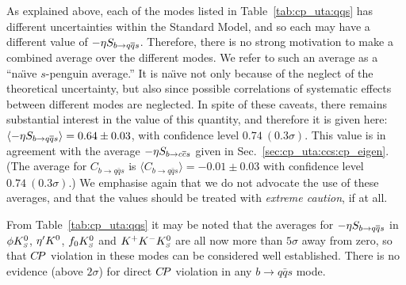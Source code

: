 As explained above,
each of the modes listed in Table~\ref{tab:cp_uta:qqs} has
different uncertainties within the Standard Model,
and so each may have a different value of $-\etacp S_{b \to q\bar q s}$.
Therefore, there is no strong motivation to make a combined average
over the different modes.
We refer to such an average as a ``na\"\i ve $s$-penguin average.''
It is na\"\i ve not only because of the neglect of the theoretical uncertainty,
but also since possible correlations of systematic effects 
between different modes are neglected.
In spite of these caveats, there remains substantial interest 
in the value of this quantity,
and therefore it is given here:
$\langle -\etacp S_{b \to q\bar q s} \rangle = 0.64 \pm 0.03$,
with confidence level $0.74~(0.3\sigma)$.
This value is in agreement with the average 
$-\etacp S_{b \to c\bar c s}$ given in Sec.~\ref{sec:cp_uta:ccs:cp_eigen}.
%
(The average for $C_{b \to q\bar q s}$ is 
$\langle C_{b \to q\bar q s} \rangle = -0.01 \pm 0.03$
with confidence level $0.74~(0.3\sigma)$.)
%
We emphasise again that we do not advocate the use of these averages,
and that the values should be treated with {\it extreme caution}, if at all.

From Table~\ref{tab:cp_uta:qqs} it may be noted 
that the averages for $-\etacp S_{b \to q\bar q s}$ in 
$\phi K^0_{\scriptscriptstyle S}$, ${\eta^{\prime}} K^0$, $f_0K^0_{\scriptscriptstyle S}$ and $K^+K^-K^0_{\scriptscriptstyle S}$
are all now more than $5\sigma$ away from zero, 
so that $C\!P$ violation in these modes can be considered well established.
There is no evidence (above $2\sigma$) for direct $C\!P$ violation 
in any $b \to q \bar q s$ mode.

